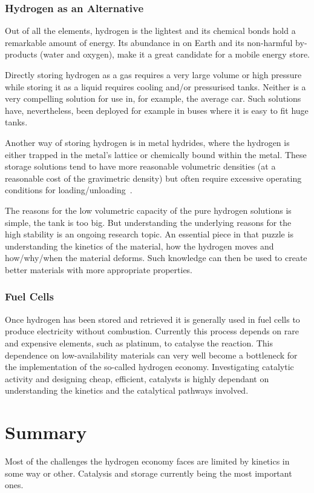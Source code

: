 \subsubsection{Hydrogen as an Alternative}
Out of all the elements, hydrogen is the lightest and its chemical bonds hold a remarkable amount of energy.
Its abundance in on Earth and its non-harmful by-products (water and oxygen), make it a great candidate for a mobile energy store.

Directly storing hydrogen as a gas requires a very large volume or high pressure while storing it as a liquid requires cooling and/or pressurised tanks.
Neither is a very compelling solution for use in, for example, the average car.
Such solutions have, nevertheless, been deployed for example in buses where it is easy to fit huge tanks. %

Another way of storing hydrogen is in metal hydrides, where the hydrogen is either trapped in the metal's lattice or chemically bound within the metal.
These storage solutions tend to have more reasonable volumetric densities (at a reasonable cost of the gravimetric density) but often require excessive operating conditions for loading/unloading~\cite{borohydride-stability-2006}.

The reasons for the low volumetric capacity of the pure hydrogen solutions is simple, the tank is too big.
But understanding the underlying reasons for the high stability is an ongoing research topic.
An essential piece in that puzzle is understanding the kinetics of the material, how the hydrogen moves and how/why/when the material deforms.
Such knowledge can then be used to create better materials with more appropriate properties.

\subsubsection{Fuel Cells}
Once hydrogen has been stored and retrieved it is generally used in fuel cells to produce electricity without combustion. %
Currently this process depends on rare and expensive elements, such as platinum, to catalyse the reaction.
This dependence on low-availability materials can very well become a bottleneck for the implementation of the so-called hydrogen economy.
Investigating catalytic activity and designing cheap, efficient, catalysts is highly dependant on understanding the kinetics and the catalytical pathways involved.

\section{Summary}
Most of the challenges the hydrogen economy faces are limited by kinetics in some way or other.
Catalysis and storage currently being the most important ones.

